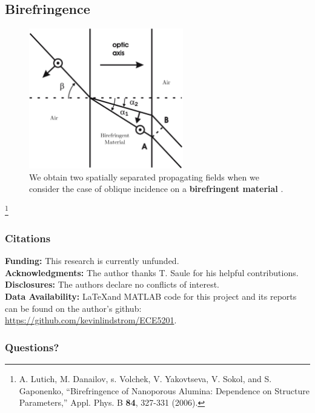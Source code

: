 \documentclass[aspectratio=169,t,xcolor=table]{beamer}
\newcommand\blfootnote[1]{%
  \begingroup
  \renewcommand\thefootnote{}\footnote[frame]{\tiny #1}%
  \addtocounter{footnote}{-1}%
  \endgroup
}
\begin{document}
        \subsection{Birefringence}
        \begin{frame}
            \vspace{-0.7em}
            \begin{figure}[H]
                \centering
                \includegraphics[width=0.6\textwidth]{figs/Birefringence.png}
                \vspace{-0.7em}
                \caption{
                    We obtain two spatially separated propagating fields when 
                    we consider
                    the case of oblique incidence on a \textbf{birefringent 
                    material} \cite{BR_IM}.
                }
                \label{fig:BR}
            \end{figure}\vspace{-2em}
            \blfootnote{
                \cite{BR_IM} A. Lutich, M. Danailov, s. Volchek, V. Yakovtseva, 
                V. Sokol, and S. Gaponenko, ``Birefringence of Nanoporous 
                Alumina: Dependence on
                Structure Parameters,'' Appl. Phys. B \textbf{84}, 327-331 (2006).
            }
        \end{frame}


\begin{frame}
    \frametitle{Citations}
    \vspace{-1.25em}
    \tiny
    \vspace{1em}
        \textbf{Funding:}
        This research is currently unfunded.\\
        \vspace{0.5em}
        \textbf{Acknowledgments:}
        The author thanks T. Saule
        for his helpful contributions.\\
        \vspace{0.5em}
        \textbf{Disclosures:}
        The authors declare no conflicts of interest.\\
        \vspace{0.5em}
        \textbf{Data Availability:} \LaTeX and MATLAB code for this project and
        its reports can be found on the author's github:
        \url{https://github.com/kevinlindstrom/ECE5201}.
   
\end{frame}


\begin{frame}
    \frametitle{Questions?}
\end{frame}
\end{document}
